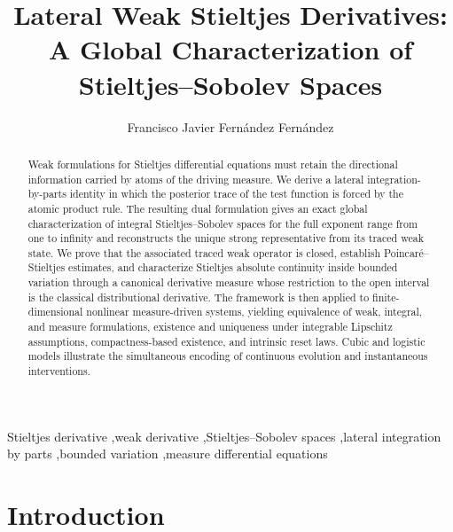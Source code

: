 \documentclass[preprint,12pt]{elsarticle}
\newcommand{\rev}[1]{{\color{red}#1}}
\newcommand{\rev}[1]{#1}
\theoremstyle{definition}
\theoremstyle{remark}
\begin{document}
\begin{frontmatter}

\title{Lateral Weak Stieltjes Derivatives: A Global Characterization of Stieltjes--Sobolev Spaces}

\author[usc]{Francisco Javier Fern\'andez Fern\'andez}

\begin{abstract}
Weak formulations for Stieltjes differential equations must retain the directional information carried by atoms of the driving measure. We derive a lateral integration-by-parts identity in which the posterior trace of the test function is forced by the atomic product rule. The resulting dual formulation gives an exact global characterization of integral Stieltjes--Sobolev spaces for the full exponent range from one to infinity and reconstructs the unique strong representative from its traced weak state. We prove that the associated traced weak operator is closed, establish Poincar\'e--Stieltjes estimates, and \rev{characterize Stieltjes absolute continuity inside bounded variation through a canonical derivative measure whose restriction to the open interval is the classical distributional derivative}. The framework is then applied to finite-dimensional nonlinear measure-driven systems, yielding equivalence of weak, integral, and measure formulations, existence and uniqueness under integrable Lipschitz assumptions, compactness-based existence, and intrinsic reset laws. Cubic and logistic models illustrate the simultaneous encoding of continuous evolution and instantaneous interventions.
\end{abstract}

\begin{keyword}
Stieltjes derivative \sep weak derivative \sep Stieltjes--Sobolev spaces \sep lateral integration by parts \sep bounded variation \sep measure differential equations
\end{keyword}

\end{frontmatter}

\section{Introduction}
\end{document}
